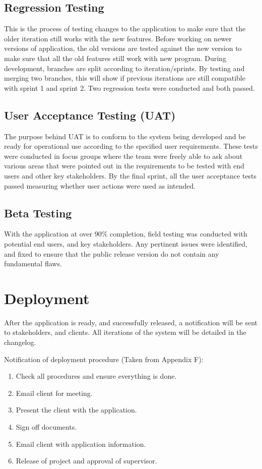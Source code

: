 \subsection{Regression Testing}
This is the process of testing changes to the application to make sure that the older iteration still works with the new features. Before working on newer versions of application, the old versions are tested against the new version to make sure that all the old features still work with new program. During development, branches are split according to iteration/sprints. By testing and merging two branches, this will show if previous iterations are still compatible with sprint 1 and sprint 2. Two regression tests were conducted and both passed.

\subsection{User Acceptance Testing (UAT)}
The purpose behind UAT is to conform to the system being developed and be ready for operational use according to the specified user requirements. These tests were conducted in focus groups where the team were freely able to ask about various areas that were pointed out in the requirements to be tested with end users and other key stakeholders. By the final sprint, all the user acceptance tests passed measuring whether user actions were used as intended.

\subsection{Beta Testing}
With the application at over 90\% completion, field testing was conducted with potential end users, and key stakeholders. Any pertinent issues were identified, and fixed to ensure that the public release version do not contain any fundamental flaws.

\section{Deployment}
After the application is ready, and successfully released, a notification will be sent to stakeholders, and clients. All iterations of the system will be detailed in the changelog.

Notification of deployment procedure (Taken from Appendix F):

\begin{enumerate}
	\item Check all procedures and ensure everything is done.
	\item Email client for meeting.
	\item Present the client with the application.
	\item Sign off documents.
	\item Email client with application information.
	\item Release of project and approval of supervisor.
\end{enumerate}

